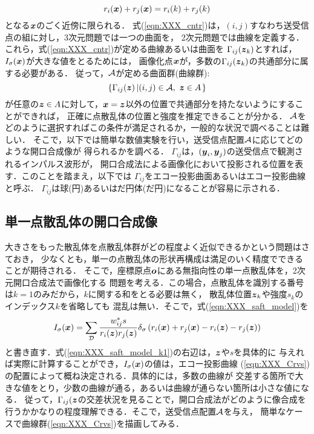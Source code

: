 \begin{equation}
	r_i(\mbox{\boldmath $x$})+r_j(\mbox{\boldmath $x$})=r_i(k)+r_j(k)
	\label{eqn:XXX_cntr}
\end{equation}
となる$\mbox{\boldmath $x$}$のごく近傍に限られる．
式(\ref{eqn:XXX_cntr})は，$(i,j)$すなわち送受信点の組に対し，3次元問題では一つの曲面を，
2次元問題では曲線を定義する．これら，式(\ref{eqn:XXX_cntr})が定める曲線あるいは曲面を
$\Gamma_{ij}(\mbox{\boldmath $z$}_k)$とすれば，$I_\sigma(\mbox{\boldmath $x$})$が大きな値をとるためには，
画像化点$\mbox{\boldmath $x$}$が，多数の$\Gamma_{ij}(\mbox{\boldmath $z$}_k)$の共通部分に属する必要がある．
従って，$\cal A$が定める曲面群(曲線群):
\begin{equation}
	\left\{ \Gamma_{ij}(\mbox{\boldmath $z$})\left|  (i,j)\in {\cal A} ,\,\, \mbox{\boldmath $z$} \in A \right.\right\}
	\label{eqn:XXX_Crvs}
\end{equation}
が任意の$\mbox{\boldmath $z$}\in A$に対して，$\mbox{\boldmath $x$}=\mbox{\boldmath $z$}$以外の位置で共通部分を持たないようにすることができれば，
正確に点散乱体の位置と強度を推定できることが分かる．
$\cal A$をどのように選択すればこの条件が満足されるか，一般的な状況で調べることは難しい．
そこで，以下では簡単な数値実験を行い，送受信点配置$\cal A$に応じてどのような開口合成像が
得られるかを調べる．
$\Gamma_{ij}$は，$(\mbox{\boldmath $y$}_i,\mbox{\boldmath $y$}_j)$の送受信点で観測されるインパルス波形が，
開口合成法による画像化において投影される位置を表す．このことを踏まえ，以下では
$\Gamma_{ij}$をエコー投影曲面あるいはエコー投影曲線と呼ぶ．
$\Gamma_{ij}$は球(円)あるいはだ円体(だ円)になることが容易に示される．
\subsection{単一点散乱体の開口合成像}
大きさをもった散乱体を点散乱体群がどの程度よく近似できるかという問題はさておき，
少なくとも，単一の点散乱体の形状再構成は満足のいく精度でできることが期待される．
そこで，座標原点$\mbox{\boldmath $o$}$にある無指向性の単一点散乱体を，2次元開口合成法で画像化する
問題を考える．この場合，点散乱体を識別する番号は$k=1$のみだから，$k$に関する和をとる必要は無く，
散乱体位置$\mbox{\boldmath $z$}_k$や強度$s_k$のインデックス$k$を省略しても
混乱は無い．そこで，式(\ref{eqn:XXX_saft_model})を
\begin{equation}
	I_\sigma(\mbox{\boldmath $x$})
		=
	\sum_{\cal D} 
	\frac{w_{ij}^*s}{r_i(\mbox{\boldmath $z$})r_j(\mbox{\boldmath $z$})} 
	\delta_\sigma\left(r_i(\mbox{\boldmath $x$})+r_j(\mbox{\boldmath $x$})-r_i(\mbox{\boldmath $z$})-r_j(\mbox{\boldmath $z$})\right) 
	\label{eqn:XXX_saft_model_k1}
\end{equation}
と書き直す．式(\ref{eqn:XXX_saft_model_k1})の右辺は，$\mbox{\boldmath $z$}$や$s$を具体的に
与えれば実際に計算することができ，$I_\sigma(\mbox{\boldmath $x$})$の値は，エコー投影曲線
(\ref{eqn:XXX_Crvs})の配置によって概ね決定される．具体的には，多数の曲線が
交差する箇所で大きな値をとり，少数の曲線が通る，あるいは曲線が通らない箇所は小さな値になる．
従って，$\Gamma_{ij}(\mbox{\boldmath $z$}$の交差状況を見ることで，開口合成法がどのように像合成を
行うかかなりの程度理解できる．そこで，送受信点配置$\cal A$を与え，
簡単なケースで曲線群(\ref{eqn:XXX_Crvs})を描画してみる．

